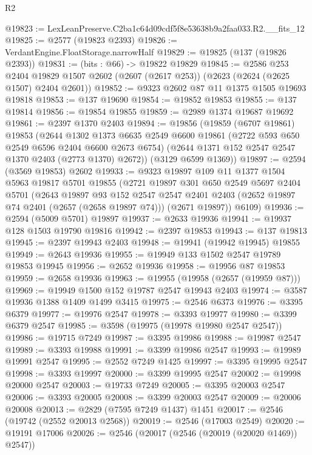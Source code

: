 \begin{lexlean}{R2}
\begin{coremodule}
@19823 := LexLeanPreserve.C2ba1c64d09cdf5f8e53638b9a2faa033.R2.__fits_12
@19825 := @2577 (@19823 @2393)
@19826 := VerdantEngine.FloatStorage.narrowHalf
@19829 := @19825 (@137 (@19826 @2393))
@19831 := (bits : @66) -> @19822 @19829
@19845 := @2586
    @253
    @2404
    @19829
    @1507
    @2602
    (@2607 (@2617 @253))
    (@2623 (@2624 (@2625 @1507) @2404 @2601))
@19852 := @9323 @2602 @87 @11 @1375 @1505 @19693 @19818
@19853 := @137 @19690
@19854 := @19852 @19853
@19855 := @137 @19814
@19856 := @19854 @19855
@19859 := @2989 @1374 @19687 @19692
@19861 := @2397 @1370 @2403
@19894 := @19856
    (@19859
      (@6707 @19861)
      @19853
      (@2644
        @1302
        @1373
        @6635
        @2549
        @6600
        @19861
        (@2722 @593 @650 @2549 @6596 @2404 @6600 @2673 @6754)
        (@2644 @1371 @152 @2547 @2547 @1370 @2403 (@2773 @1370) @2672))
      (@3129 @6599 @1369))
@19897 := @2594 (@3569 @19853) @2602
@19933 := @9323
    @19897
    @109
    @11
    @1377
    @1504
    @5963
    @19817
    @5701
    @19855
    (@2721
      @19897
      @301
      @650
      @2549
      @5697
      @2404
      @5701
      (@2643
        @19897
        @93
        @152
        @2547
        @2547
        @2401
        @2403
        (@2652 @19897 @74 @2401 (@2657 (@2658 @19897 @74)))
        (@2671 @19897))
      @6109)
@19936 := @2594 (@5009 @5701) @19897
@19937 := @2633 @19936
@19941 := @19937 @128 @1503 @19790 @19816
@19942 := @2397 @19853
@19943 := @137 @19813
@19945 := @2397 @19943 @2403
@19948 := @19941 (@19942 @19945) @19855
@19949 := @2643 @19936
@19955 := @19949 @133 @1502 @2547 @19789 @19853 @19945
@19956 := @2652 @19936
@19958 := @19956 @87 @19853
@19959 := @2658 @19936
@19963 := @19955 (@19958 (@2657 (@19959 @87)))
@19969 := @19949 @1500 @152 @19787 @2547 @19943 @2403
@19974 := @3587 @19936 @1388 @1409 @1499 @3415
@19975 := @2546 @6373
@19976 := @3395 @6379
@19977 := @19976 @2547
@19978 := @3393 @19977
@19980 := @3399 @6379 @2547
@19985 := @3598 (@19975 (@19978 @19980 @2547 @2547))
@19986 := @19715 @7249
@19987 := @3395 @19986
@19988 := @19987 @2547
@19989 := @3393 @19988
@19991 := @3399 @19986 @2547
@19993 := @19989 @19991 @2547
@19995 := @2552 @7249 @1425
@19997 := @3395 @19995 @2547
@19998 := @3393 @19997
@20000 := @3399 @19995 @2547
@20002 := @19998 @20000 @2547
@20003 := @19733 @7249
@20005 := @3395 @20003 @2547
@20006 := @3393 @20005
@20008 := @3399 @20003 @2547
@20009 := @20006 @20008
@20013 := @2829 (@7595 @7249 @1437) @1451
@20017 := @2546 (@19742 (@2552 @20013 @2568))
@20019 := @2546 (@17003 @2549)
@20020 := @19191 @17006
@20026 := @2546 (@20017 (@2546 (@20019 (@20020 @1469)) @2547))

\end{coremodule}
\end{lexlean}
